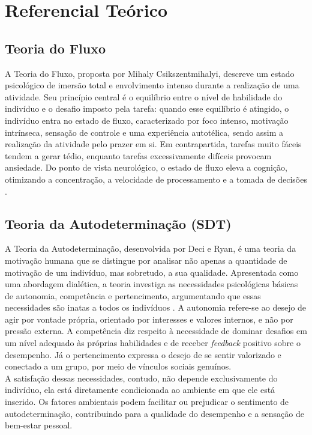 \section{Referencial Teórico}

\subsection{Teoria do Fluxo}
A Teoria do Fluxo, proposta por Mihaly Csikszentmihalyi, descreve um estado psicológico de imersão total e envolvimento intenso durante a realização de uma atividade. Seu princípio central é o equilíbrio entre o nível de habilidade do indivíduo e o desafio imposto pela tarefa: quando esse equilíbrio é atingido, o indivíduo entra no estado de fluxo, caracterizado por foco intenso, motivação intrínseca, sensação de controle e uma experiência autotélica, sendo assim a realização da atividade pelo prazer em si. Em contrapartida, tarefas muito fáceis tendem a gerar tédio, enquanto tarefas excessivamente difíceis provocam ansiedade. Do ponto de vista neurológico, o estado de fluxo eleva a cognição, otimizando a concentração, a velocidade de processamento e a tomada de decisões \cite{csikszentmihalyi1989optimal}.

\subsection{Teoria da Autodeterminação (SDT)}
A Teoria da Autodeterminação, desenvolvida por Deci e Ryan, é uma teoria da motivação humana que se distingue por analisar não apenas a quantidade de motivação de um indivíduo, mas sobretudo, a sua qualidade. Apresentada como uma abordagem dialética, a teoria investiga as necessidades psicológicas básicas de autonomia, competência e pertencimento, argumentando que essas necessidades são inatas a todos os indivíduos \cite{cernev2012autodeterminacao}. A autonomia refere-se ao desejo de agir por vontade própria, orientado por interesses e valores internos, e não por pressão externa. A competência diz respeito à necessidade de dominar desafios em um nível adequado às próprias habilidades e de receber \textit{feedback} positivo sobre o desempenho. Já o pertencimento expressa o desejo de se sentir valorizado e conectado a um grupo, por meio de vínculos sociais genuínos.\\
\indent A satisfação dessas necessidades, contudo, não depende exclusivamente do indivíduo, ela está diretamente condicionada ao ambiente em que ele está inserido. Os fatores ambientais podem facilitar ou prejudicar o sentimento de autodeterminação, contribuindo para a qualidade do desempenho e a sensação de bem-estar pessoal.

